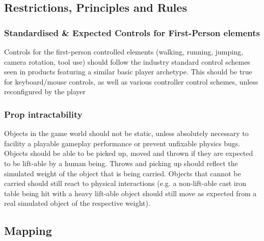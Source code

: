 \documentclass[10pt,a4paper]{article}
\begin{document}
\subsection{Restrictions, Principles and Rules}
\subsubsection{Standardised \& Expected Controls for First-Person elements}
Controls for the first-person controlled elements (walking, running, jumping, camera rotation, tool use) should follow the industry standard control schemes seen in products featuring a similar basic player archetype. This should be true for keyboard/mouse controls, as well as various controller control schemes, unless reconfigured by the player
\subsubsection{Prop intractability}
Objects in the game world should not be static, unless absolutely necessary to facility a playable gameplay performance or prevent unfixable physics bugs. Objects should be able to be picked up, moved and thrown if they are expected to be lift-able by a human being. Throws and picking up should reflect the simulated weight of the object that is being carried. Objects that cannot be carried should still react to physical interactions (e.g. a non-lift-able cast iron table being hit with a heavy lift-able object should still move as expected from a real simulated object of the respective weight).
\subsection{Mapping}
\end{document}
